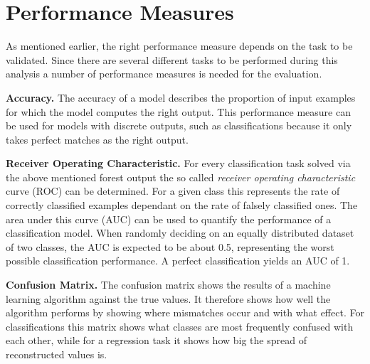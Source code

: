 \section{Performance Measures}
%
As mentioned earlier, the right performance measure depends on the task to be
validated. Since there are several different tasks to be performed during this
analysis a number of performance measures is needed for the evaluation.

\textbf{Accuracy.} The accuracy of a model describes the proportion of input
examples for which the model computes the right output. This performance
measure can be used for models with discrete outputs, such as classifications
because it only takes perfect matches as the right output.

\textbf{Receiver Operating Characteristic.} For every classification task solved via the above mentioned forest output the
so called \textit{receiver operating characteristic} curve (ROC) can be
determined. For a given class this represents the rate of correctly classified
examples dependant on the rate of falsely classified ones. The area under this
curve (AUC) can be used to quantify the performance of a classification model.
When randomly deciding on an equally distributed dataset of two classes, the
AUC is expected to be about \num{0.5}, representing the worst possible
classification performance. A perfect classification yields an AUC of \num{1}.

\textbf{Confusion Matrix.} The confusion matrix shows the results of a machine
learning algorithm against the true values. It therefore shows how well the
algorithm performs by showing where mismatches occur and with what effect. For
classifications this matrix shows what classes are most frequently confused
with each other, while for a regression task it shows how big the spread of
reconstructed values is.

